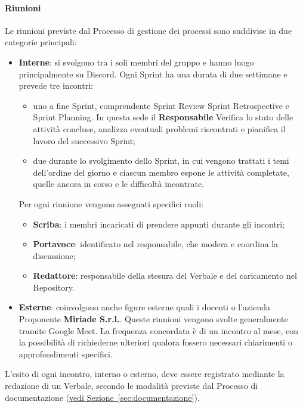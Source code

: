 \documentclass[a4paper,12pt]{article}
\begin{document}
\paragraph{Riunioni}
Le riunioni previste dal Processo di gestione dei processi sono suddivise in due categorie principali:
\begin{itemize}
    \item \textbf{Interne}: si svolgono tra i soli membri del gruppo e hanno luogo principalmente su Discord. Ogni Sprint ha una durata di due settimane e prevede tre incontri:
    \begin{itemize}
        \item uno a fine Sprint, comprendente Sprint Review Sprint Retrospective e Sprint Planning. In questa sede il \textbf{Responsabile} Verifica lo stato delle attività concluse, analizza eventuali problemi riscontrati e pianifica il lavoro del successivo Sprint;
        \item due durante lo svolgimento dello Sprint, in cui vengono trattati i temi dell'ordine del giorno e ciascun membro espone le attività completate, quelle ancora in corso e le difficoltà incontrate.
    \end{itemize}
    Per ogni riunione vengono assegnati specifici ruoli:
    \begin{itemize}
        \item \textbf{Scriba}: i membri incaricati di prendere appunti durante gli incontri;
        \item \textbf{Portavoce}: identificato nel responsabile, che modera e coordina la discussione;
        \item \textbf{Redattore}: responsabile della stesura del Verbale e del caricamento nel Repository.
    \end{itemize}
    \item \textbf{Esterne}: coinvolgono anche figure esterne quali i docenti o l'azienda Proponente \textbf{Miriade S.r.l.}. Queste riunioni vengono svolte generalmente tramite Google Meet. La frequenza concordata è di un incontro al mese, con la possibilità di richiederne ulteriori qualora fossero necessari chiarimenti o approfondimenti specifici.
\end{itemize}
L'esito di ogni incontro, interno o esterno, deve essere registrato mediante la redazione di un Verbale, secondo le modalità previste dal Processo di documentazione (\hyperref[sec:documentazione]{vedi Sezione~\ref*{sec:documentazione}}). 

\end{document}
